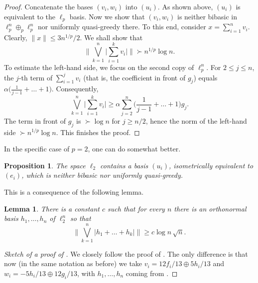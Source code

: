 \documentclass[12pt,leqno]{amsart}
\newtheorem{proposition}[theorem]{Proposition}
\newtheorem{lemma}[theorem]{Lemma}
\numberwithin{equation}{section}
\theoremstyle{definition}
\begin{document}
\begin{proof}
Concatenate the bases $(v_i, w_i)$ into $(u_i)$. As shown above, $(u_i)$ is equivalent to the $\ell_p$ basis. Now we show that $(v_i, w_i)$ is neither bibasic in $\ell_p^n \oplus_p \ell_p^n$ nor uniformly quasi-greedy there. To this end, consider $x = \sum_{i=1}^n v_i$. Clearly, $\|x\| \leq 3 n^{1/p}/2$. We shall show that
$$
\Big\| \bigvee_{k=1}^n \Big| \sum_{i=1}^k v_i \Big| \Big\| \succ n^{1/p} \log n .
$$
To estimate the left-hand side, we focus on the second copy of $\ell_p^n$. For $2 \leq j \leq n$, the $j$-th term of $\sum_{i=1}^j v_i$ (that is, the coefficient in front of $g_j$) equals
$\alpha \big( \frac1{j-1} + \ldots + 1 \big)$. Consequently,
$$
\bigvee_{k=1}^n \Big| \sum_{i=1}^k v_i \Big| \geq \alpha \sum_{j=2}^n \Big( \frac1{j-1} + \ldots + 1 \Big) g_j .
$$
The term in front of $g_j$ is $\succ \log n$ for $j \geq n/2$, hence the norm of the left-hand side $\succ n^{1/p} \log n$. This finishes the proof.
\end{proof}

In the specific case of $p=2$, one can do somewhat better.

\begin{proposition}\label{p:destroy_l2_isometrically}
 The space $\ell_2$ contains a basis $(u_i)$, isometrically equivalent to $(e_i)$,  which is neither bibasic nor uniformly quasi-greedy.
\end{proposition}
This is a consequence of the following lemma.


\begin{lemma}\label{l:unitaries}
 There is a constant $c$ such that for every $n$ there is an orthonormal basis $h_1, \ldots, h_n$ of $\ell_2^n$ so that
 $$
 \Big\| \bigvee_{k=1}^n \big|h_1 + \ldots + h_k\big| \Big\| \geq c \log n \, \sqrt{n} .
 $$
\end{lemma}

\begin{proof}[Sketch of a proof of ]
We closely follow the proof of . The only difference is that now (in the same notation as before) we take $v_i = 12 f_i/13 \oplus 5 h_i/13$ and $w_i = -5 h_i/13 \oplus 12 g_i/13$, with $h_1, \ldots, h_n$ coming from .
\end{proof}

\end{document}
